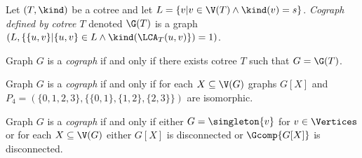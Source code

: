 \begin{defi}\label{codef3}
    Let $(T, \kind)$ be a cotree and let $L = \{v | v \in \V(T) \land \kind(v) = s\}$. \emph{Cograph defined by cotree $T$} denoted $\G(T)$ is a graph $(L, \{\{u,v\} | \{u,v\} \in L \land \kind(\LCA_T(u,v)\}) = 1)$.

    Graph $G$ is a \emph{cograph} if and only if there exists cotree $T$ such that $G = \G(T)$.
\end{defi}

\begin{defi}\label{codef4}
    Graph $G$ is a \emph{cograph} if and only if for each $X \subseteq \V(G)$ graphs $G[X]$ and $P_4 = (\{0,1,2,3\}, \{\{0,1\},\{1,2\},\{2,3\}\})$ are  isomorphic.
\end{defi}

\begin{defi}\label{codef5}
    Graph $G$ is a \emph{cograph} if and only if either $G = \singleton{v}$ for $v \in \Vertices$ or for each $X \subseteq \V(G)$ either $G[X]$ is disconnected or $\Gcomp{G[X]}$ is disconnected.
\end{defi}
